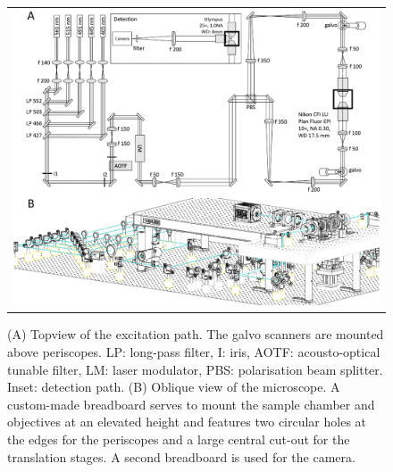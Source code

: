 \documentclass[12pt]{spieman}  %
\begin{document}
		
		\begin{figure}
   \begin{center}
   \begin{tabular}{c}
   \includegraphics[width=\textwidth]{frame1.eps}
   \end{tabular}
   \end{center}
   \caption{\label{fig:excitation} (A) Topview of the excitation path. The galvo scanners are mounted above periscopes. LP: long-pass filter, I: iris, AOTF: acousto-optical tunable filter, LM: laser modulator, PBS: polarisation beam splitter. Inset: detection path. (B) Oblique view of the microscope. A custom-made breadboard serves to mount the sample chamber and objectives at an elevated height and features two circular holes at the edges for the periscopes and a large central cut-out for the translation stages. A second breadboard is used for the camera.} 
   \end{figure}
\end{document}

